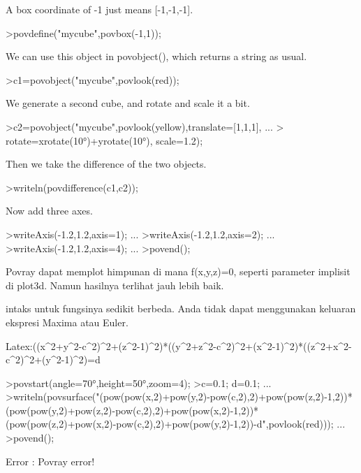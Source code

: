 \documentclass[a4paper,10pt]{article}
\begin{document}
\begin{eulernotebook}
\begin{eulercomment}
A box coordinate of -1 just means [-1,-1,-1].
\end{eulercomment}
\begin{eulerprompt}
>povdefine("mycube",povbox(-1,1));
\end{eulerprompt}
\begin{eulercomment}
We can use this object in povobject(), which returns a string as
usual.
\end{eulercomment}
\begin{eulerprompt}
>c1=povobject("mycube",povlook(red));
\end{eulerprompt}
\begin{eulercomment}
We generate a second cube, and rotate and scale it a bit.
\end{eulercomment}
\begin{eulerprompt}
>c2=povobject("mycube",povlook(yellow),translate=[1,1,1], ...
>  rotate=xrotate(10°)+yrotate(10°), scale=1.2);
\end{eulerprompt}
\begin{eulercomment}
Then we take the difference of the two objects.
\end{eulercomment}
\begin{eulerprompt}
>writeln(povdifference(c1,c2));
\end{eulerprompt}
\begin{eulercomment}
Now add three axes.
\end{eulercomment}
\begin{eulerprompt}
>writeAxis(-1.2,1.2,axis=1); ...
>writeAxis(-1.2,1.2,axis=2); ...
>writeAxis(-1.2,1.2,axis=4); ...
>povend();
\end{eulerprompt}
\begin{eulercomment}
Povray dapat memplot himpunan di mana f(x,y,z)=0, seperti parameter
implisit di plot3d. Namun hasilnya terlihat jauh lebih baik.


intaks untuk fungsinya sedikit berbeda. Anda tidak dapat menggunakan
keluaran ekspresi Maxima atau Euler.


Latex:((x\textasciicircum{}2+y\textasciicircum{}2-c\textasciicircum{}2)\textasciicircum{}2+(z\textasciicircum{}2-1)\textasciicircum{}2)*((y\textasciicircum{}2+z\textasciicircum{}2-c\textasciicircum{}2)\textasciicircum{}2+(x\textasciicircum{}2-1)\textasciicircum{}2)*((z\textasciicircum{}2+x\textasciicircum{}2-c\textasciicircum{}2)\textasciicircum{}2+(y\textasciicircum{}2-1)\textasciicircum{}2)=d
\end{eulercomment}
\begin{eulerprompt}
>povstart(angle=70°,height=50°,zoom=4);
>c=0.1; d=0.1; ...
>writeln(povsurface("(pow(pow(x,2)+pow(y,2)-pow(c,2),2)+pow(pow(z,2)-1,2))*(pow(pow(y,2)+pow(z,2)-pow(c,2),2)+pow(pow(x,2)-1,2))*(pow(pow(z,2)+pow(x,2)-pow(c,2),2)+pow(pow(y,2)-1,2))-d",povlook(red))); ...
>povend();
\end{eulerprompt}
\begin{euleroutput}
  Error : Povray error!
  

\end{euleroutput}
\end{eulernotebook}
\end{document}
